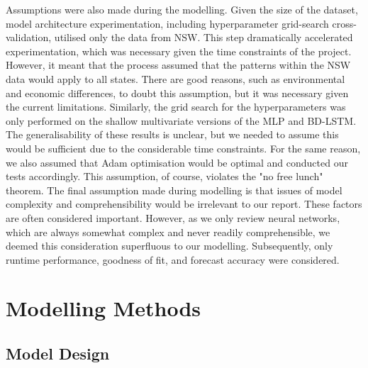 \documentclass[mstat,12pt]{unswthesis}
\begin{document}
Assumptions were also made during the modelling. Given the size of the dataset, model architecture experimentation, including hyperparameter grid-search cross-validation, utilised only the data from NSW. This step dramatically accelerated experimentation, which was necessary given the time constraints of the project. However, it meant that the process assumed that the patterns within the NSW data would apply to all states. There are good reasons, such as environmental and economic differences, to doubt this assumption, but it was necessary given the current limitations. Similarly, the grid search for the hyperparameters was only performed on the shallow multivariate versions of the MLP and BD-LSTM. The generalisability of these results is unclear, but we needed to assume this would be sufficient due to the considerable time constraints. For the same reason, we also assumed that Adam optimisation would be optimal and conducted our tests accordingly. This assumption, of course, violates the "no free lunch" theorem. The final assumption made during modelling is that issues of model complexity and comprehensibility would be irrelevant to our report. These factors are often considered important. However, as we only review neural networks, which are always somewhat complex and never readily comprehensible, we deemed this consideration superfluous to our modelling. Subsequently, only runtime performance, goodness of fit, and forecast accuracy were considered.

\hypertarget{modelling-methods}{%
\section{Modelling Methods}\label{modelling-methods}}

\hypertarget{model-design}{%
\subsection{Model Design}\label{model-design}}
\end{document}
